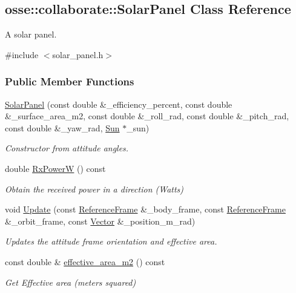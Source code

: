 \hypertarget{classosse_1_1collaborate_1_1_solar_panel}{}\subsection{osse\+:\+:collaborate\+:\+:Solar\+Panel Class Reference}
\label{classosse_1_1collaborate_1_1_solar_panel}


A solar panel.  




{\ttfamily \#include $<$solar\+\_\+panel.\+h$>$}

\subsubsection*{Public Member Functions}
\begin{DoxyCompactItemize}
\item 
\hyperlink{classosse_1_1collaborate_1_1_solar_panel_a060136ae41f3ce295647564b92450e1c}{Solar\+Panel} (const double \&\+\_\+efficiency\+\_\+percent, const double \&\+\_\+surface\+\_\+area\+\_\+m2, const double \&\+\_\+roll\+\_\+rad, const double \&\+\_\+pitch\+\_\+rad, const double \&\+\_\+yaw\+\_\+rad, \hyperlink{classosse_1_1collaborate_1_1_sun}{Sun} $\ast$\+\_\+sun)
\begin{DoxyCompactList}\small\item\em Constructor from attitude angles. \end{DoxyCompactList}\item 
double \hyperlink{classosse_1_1collaborate_1_1_solar_panel_ac32a08edad4d388bc8bc859a1bc0a513}{Rx\+PowerW} () const
\begin{DoxyCompactList}\small\item\em Obtain the received power in a direction (Watts) \end{DoxyCompactList}\item 
void \hyperlink{classosse_1_1collaborate_1_1_solar_panel_a800aa0d521177fcf9b5175c3f6f6529d}{Update} (const \hyperlink{classosse_1_1collaborate_1_1_reference_frame}{Reference\+Frame} \&\+\_\+body\+\_\+frame, const \hyperlink{classosse_1_1collaborate_1_1_reference_frame}{Reference\+Frame} \&\+\_\+orbit\+\_\+frame, const \hyperlink{classosse_1_1collaborate_1_1_vector}{Vector} \&\+\_\+position\+\_\+m\+\_\+rad)
\begin{DoxyCompactList}\small\item\em Updates the attitude frame orientation and effective area. \end{DoxyCompactList}\item 
const double \& \hyperlink{classosse_1_1collaborate_1_1_solar_panel_ab7c233e3e84dea59e532d0353a0f6038}{effective\+\_\+area\+\_\+m2} () const
\begin{DoxyCompactList}\small\item\em Get Effective area (meters squared) \end{DoxyCompactList}\end{DoxyCompactItemize}
